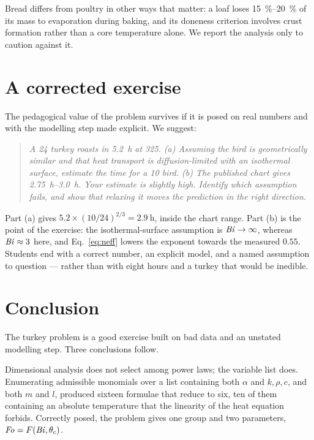 Bread differs from poultry in other ways that matter: a loaf loses
\SIrange{15}{20}{\percent} of its mass to evaporation during baking, and its
doneness criterion involves crust formation rather than a core temperature
alone. We report the analysis only to caution against it.

\section{A corrected exercise}
\label{sec:exercise}

The pedagogical value of the problem survives if it is posed on real
numbers and with the modelling step made explicit. We suggest:

\begin{quote}
\itshape
A \SI{24}{\pound} turkey roasts in \SI{5.2}{\hour} at \SI{325}{\degreeFahrenheit}.
(a) Assuming the bird is geometrically similar and that heat transport is
diffusion-limited with an isothermal surface, estimate the time for a
\SI{10}{\pound} bird. (b) The published chart gives \SIrange{2.75}{3.0}{\hour}.
Your estimate is slightly high. Identify which assumption fails, and show
that relaxing it moves the prediction in the right direction.
\end{quote}

Part (a) gives $5.2\times(10/24)^{2/3} = \SI{2.9}{\hour}$, inside the
chart range. Part (b) is the point of the exercise: the isothermal-surface
assumption is $\mathit{Bi} \to \infty$, whereas $\mathit{Bi} \approx 3$ here, and
Eq.~\eqref{eq:neff} lowers the exponent towards the measured $0.55$.
Students end with a correct number, an explicit model, and a named
assumption to question --- rather than with eight hours and a turkey that
would be inedible.

\section{Conclusion}

The turkey problem is a good exercise built on bad data and an unstated
modelling step. Three conclusions follow.

Dimensional analysis does not select among power laws; the variable list
does. Enumerating admissible monomials over a list containing both
$\alpha$ and $k,\rho,c$, and both $m$ and $l$, produced sixteen formulae
that reduce to six, ten of them containing an absolute temperature that
the linearity of the heat equation forbids. Correctly posed, the problem
gives one group and two parameters, $\mathit{Fo} = F(\mathit{Bi},\theta_{c})$.

